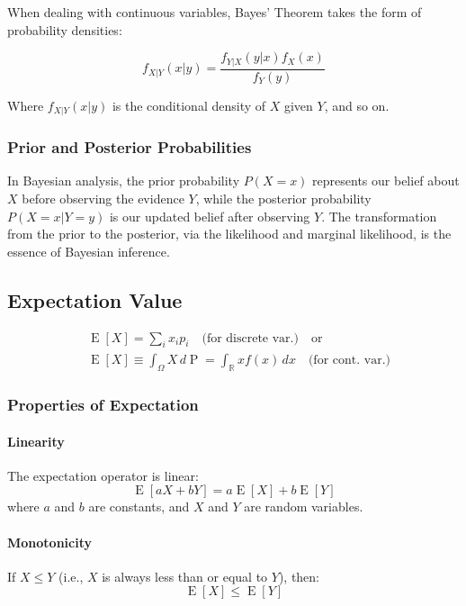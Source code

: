 \documentclass[8pt, a4paper, landscape, includeheadfoot]{extarticle}
\begin{document}
\begin{multicols*}{4}
	When dealing with continuous variables, Bayes' Theorem takes the form of probability densities:

	$$
		f_{X|Y}(x|y) = \frac{f_{Y|X}(y|x) f_X(x)}{f_Y(y)}
	$$

	Where $f_{X|Y}(x|y)$ is the conditional density of $X$ given $Y$, and so on.

	\subsubsection{Prior and Posterior Probabilities}

	In Bayesian analysis, the prior probability $P(X{=}x)$ represents our belief about $X$ before observing the evidence $Y$, while the posterior probability $P(X{=}x | Y{=}y)$ is our updated belief after observing $Y$. The transformation from the prior to the posterior, via the likelihood and marginal likelihood, is the essence of Bayesian inference.

	\subsection{Expectation Value}

	\begin{align*}
		 & \operatorname{E}[X] = \sum_i x_i p_i \quad \text{(for discrete var.)} \quad \text{or}                                        \\
		 & \operatorname{E}[X] \equiv \int_\Omega X \, d\operatorname{P} = \int_{\mathbb{R}} x f(x) \, dx \quad \text{(for cont. var.)}
	\end{align*}

	\subsubsection{Properties of Expectation}{}

	\paragraph{Linearity}
	The expectation operator is linear:
	$$
		\operatorname{E}[aX + bY] = a\operatorname{E}[X] + b\operatorname{E}[Y]
	$$
	where \(a\) and \(b\) are constants, and \(X\) and \(Y\) are random variables.

	\paragraph{Monotonicity}
	If \(X \leq Y\) (i.e., \(X\) is always less than or equal to \(Y\)), then:
	$$
		\operatorname{E}[X] \leq \operatorname{E}[Y]
	$$


\end{multicols*}
\end{document}
